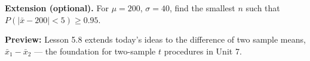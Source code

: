 \documentclass[10pt]{article}
\begin{document}
\begin{extensionbox}
\textbf{Extension (optional).}
For $\mu = 200$, $\sigma = 40$, find the smallest $n$ such that $P(|\bar{x} - 200| < 5) \ge 0.95$.
\end{extensionbox}

\begin{reflectionbox}
\textbf{Preview:} Lesson 5.8 extends today's ideas to the difference of two sample means,
$\bar{x}_1 - \bar{x}_2$ --- the foundation for two-sample $t$ procedures in Unit 7.
\end{reflectionbox}
\end{document}
